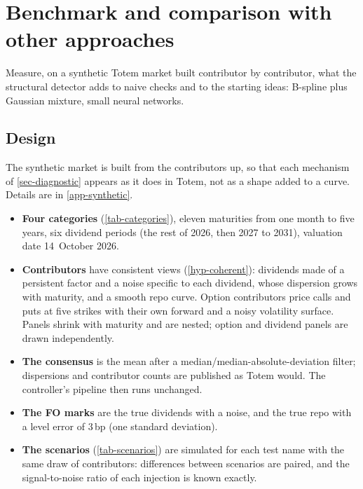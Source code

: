 \section{Benchmark and comparison with other approaches}\label{sec-benchmark}

\begin{objectif}
Measure, on a synthetic Totem market built contributor by contributor, what the structural detector adds to naive
checks and to the starting ideas: B-spline plus Gaussian mixture, small neural networks.
\end{objectif}

\subsection{Design}
The synthetic market is built from the contributors up, so that each mechanism of \cref{sec-diagnostic} appears as it
does in Totem, not as a shape added to a curve. Details are in \cref{app-synthetic}.
\begin{itemize}
\item \textbf{Four categories} (\cref{tab-categories}), eleven maturities from one month to five years, six dividend
periods (the rest of 2026, then 2027 to 2031), valuation date 14~October 2026.
\item \textbf{Contributors} have consistent views (\cref{hyp-coherent}): dividends made of a persistent factor and a
noise specific to each dividend, whose dispersion grows with maturity, and a smooth repo curve. Option contributors
price calls and puts at five strikes with their own forward and a noisy volatility surface. Panels shrink with
maturity and are nested; option and dividend panels are drawn independently.
\item \textbf{The consensus} is the mean after a median/median-absolute-deviation filter; dispersions and contributor
counts are published as Totem would. The controller's pipeline then runs unchanged.
\item \textbf{The FO marks} are the true dividends with a  noise, and the true repo with a level error of
$3$\,bp (one standard deviation).
\item \textbf{The scenarios} (\cref{tab-scenarios}) are simulated for each test name with the same draw of
contributors: differences between scenarios are paired, and the signal-to-noise ratio of each injection is known
exactly.
\end{itemize}

\begin{table}[ht]
\centering
\caption{The four categories of the synthetic market.}\label{tab-categories}

\end{table}

